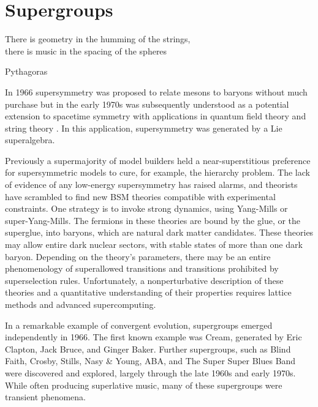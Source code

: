 \section{Supergroups}

\epigraph{There is geometry in the humming of the strings,\\
there is music in the spacing of the spheres}{Pythagoras}


In 1966 supersymmetry was proposed to relate mesons to baryons\cite{doi:10.1143/PTP.36.1266} without much purchase but in the early 1970s was subsequently understood as a potential extension to spacetime symmetry with applications in quantum field theory and string theory \cite{Gervais:1971ji,Ramond:1971gb,Volkov:1973ix,Wess:1974tw}.
In this application, supersymmetry was generated by a Lie superalgebra.

Previously a supermajority of model builders held a near-superstitious preference for supersymmetric models to cure, for example, the hierarchy problem.
The lack of evidence of any low-energy supersymmetry has raised alarms, and theorists have scrambled to find new BSM theories compatible with experimental constraints.
One strategy is to invoke strong dynamics, using Yang-Mills or super-Yang-Mills.
The fermions in these theories are bound by the glue, or the superglue, into baryons, which are natural dark matter candidates.
These theories may allow entire dark nuclear sectors, with stable states of more than one dark baryon.
Depending on the theory's parameters, there may be an entire phenomenology of superallowed transitions and transitions prohibited by superselection rules.
Unfortunately, a nonperturbative description of these theories and a quantitative understanding of their properties requires lattice methods and advanced supercomputing.

In a remarkable example of convergent evolution, supergroups emerged independently in 1966.
The first known example was Cream, generated by Eric Clapton, Jack Bruce, and Ginger Baker\cite{supergroups}.
Further supergroups, such as Blind Faith, Crosby, Stills, Nasy \& Young, ABA, and The Super Super Blues Band\cite{supersuperblues} were discovered and explored, largely through the late 1960s and early 1970s.
While often producing superlative music, many of these supergroups were transient phenomena.
